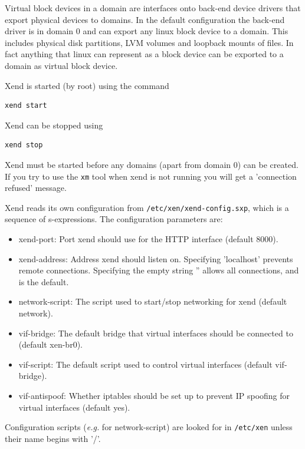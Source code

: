 \documentclass[11pt,twoside,final,openright]{report}
\begin{document}
Virtual block devices in a domain are interfaces onto back-end device drivers
that export physical devices to domains. In the default configuration the back-end
driver is in domain 0 and can export any linux block device to a domain. This includes
physical disk partitions, LVM volumes and loopback mounts of files. In fact anything
that linux can represent as a block device can be exported to a domain as virtual
block device.

Xend is started (by root) using the command
\begin{verbatim}
xend start
\end{verbatim}
Xend can be stopped using
\begin{verbatim}
xend stop
\end{verbatim}
Xend must be started before any domains (apart from domain 0) can be created.
If you try to use the {\tt xm} tool when xend is not running you will get a
'connection refused' message.

Xend reads its own configuration from {\tt /etc/xen/xend-config.sxp}, which is
a sequence of s-expressions. The configuration parameters are:
\begin{itemize}

\item xend-port: Port xend should use for the HTTP interface (default 8000).

\item xend-address: Address xend should listen on.
  Specifying 'localhost' prevents remote connections.
  Specifying the empty string '' allows all connections, and is the default.

\item network-script: The script used to start/stop networking for xend (default network).

\item vif-bridge: The default bridge that virtual interfaces should be connected to
  (default xen-br0).

\item vif-script: The default script used to control virtual interfaces
  (default vif-bridge).

\item vif-antispoof: Whether iptables should be set up to prevent IP spoofing for
  virtual interfaces (default yes).
\end{itemize}

Configuration scripts ({\it e.g.} for network-script) are looked for in {\tt /etc/xen}
unless their name begins with '/'.
\end{document}
